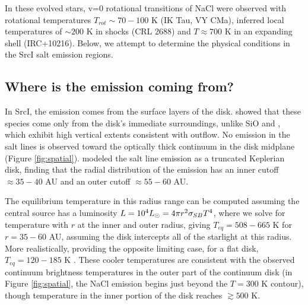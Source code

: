 \documentclass[twocolumn]{aastex62}
\newcommand{\sourcei}{SrcI\xspace}
\begin{document}
In these evolved stars, v=0 rotational transitions of NaCl were observed
with rotational temperatures ${T_{rot}\sim70-100}$ K (IK Tau, VY CMa), inferred
local temperatures of $\sim200$ K in shocks (CRL 2688) and $T\approx700$ K  in
an expanding shell (IRC+10216).  Below, we attempt to determine the physical
conditions in the \sourcei salt emission regions.

\subsection{Where is the emission coming from?}
In \sourcei, the emission comes from the surface layers of the disk.
\citet{Ginsburg2018b} showed that these species come only from the disk's
immediate surroundings, unlike SiO and \water, which exhibit high vertical
extents consistent with outflow.  No emission in the salt lines is observed
toward the optically thick continuum in the disk midplane (Figure \ref{fig:spatial}).
\citet{Ginsburg2018b} modeled the salt line emission as a truncated Keplerian
disk, finding that the radial distribution of the emission has an inner cutoff
$\approx35-40$ AU and an outer cutoff $\approx55-60$ AU.

The equilibrium temperature in this radius range can be computed assuming the central
source has a luminosity $L=10^4 L_{\odot} = 4 \pi r^2 \sigma_{SB} T^4 $, where we
solve for temperature with $r$ at the inner and outer radius, giving $T_{eq} =
508-665$ K for $r=35-60$ AU, assuming the disk intercepts all of the starlight 
at this radius.  More realistically, providing the opposite limiting case,
for a flat disk, $T_{eq}=120-185$ K \citep{Chiang1997a}.  These cooler temperatures
are consistent with the observed continuum brightness temperatures in the outer
part of the continuum disk (in Figure \ref{fig:spatial}, the NaCl emission
begins just beyond the $T=300$ K contour), though temperature in the inner
portion of the disk reaches $\gtrsim500$ K.
\end{document}
